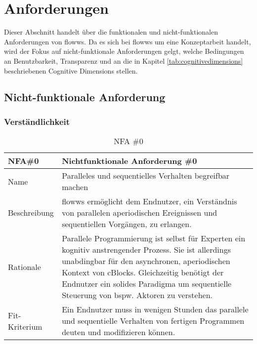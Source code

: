 \section{Anforderungen}\label{sec:anforderungen}
Dieser Abschnitt handelt über die funktionalen und nicht-funktionalen Anforderungen von flowws. Da es sich bei flowws um eine Konzeptarbeit handelt, wird der Fokus auf nicht-funktionale Anforderungen gelgt, welche Bedingungen an Benutzbarkeit, Transparenz und an die in Kapitel \ref{tab:cognitivedimensions} beschriebenen Cognitive Dimensions stellen. 

\subsection{Nicht-funktionale Anforderung}

\subsubsection{Verständlichkeit}
\begin{table}[H]
\caption{NFA \#0}
\label{tab:NFA0}
\begin{tabularx}{\textwidth}{lX}
\hline
\rowcolor[HTML]{EFEFEF} 
NFA\#0        & Nichtfunktionale Anforderung \#0 \\ \hline
Name          & Paralleles und sequentielles Verhalten begreifbar machen \\ \hline
Beschreibung  & flowws ermöglicht dem Endnutzer, ein Verständnis von parallelen aperiodischen Ereignissen und sequentiellen Vorgängen, zu erlangen. \\ \hline
Rationale     & Parallele Programmierung ist selbst für Experten ein kognitiv anstrengender Prozess. Sie ist allerdings unabdingbar für den asynchronen, aperiodischen Kontext von cBlocks. Gleichzeitig benötigt der Endnutzer ein solides Paradigma um sequentielle Steuerung von bspw. Aktoren zu verstehen. \\ \hline
Fit-Kriterium & Ein Endnutzer muss in wenigen Stunden das parallele und sequentielle Verhalten von fertigen Programmen deuten und modifizieren können.\\ \hline
\end{tabularx}
\end{table}



